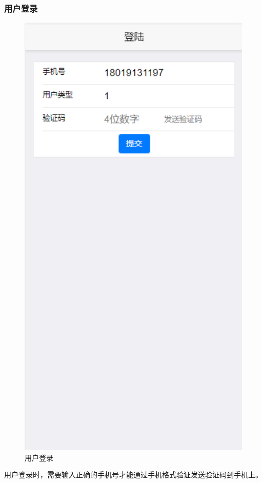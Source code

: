 \subsubsection{用户登录}
\begin{figure}[ht]
    \centering
    \includegraphics{images/login.png}
    \caption{用户登录}
    \label{fig:login}
\end{figure} 
用户登录时，需要输入正确的手机号才能通过手机格式验证发送验证码到手机上。
 
